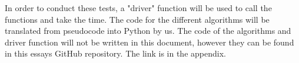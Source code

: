 \documentclass[main.tex]{subfiles}
\begin{document}
In order to conduct these tests, a "driver" function will be used to call the functions and take the time. The code for the different algorithms will be translated from pseudocode into Python by us. The code of the algorithms and driver function will not be written in this document, however they can be found in this essays GitHub repository. The link is in the appendix. 
\end{document}
